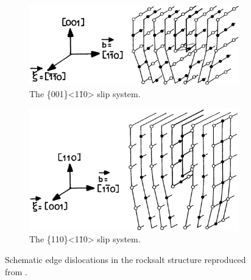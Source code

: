 \begin{figure}
\centering
\begin{subfigure}{0.6\textwidth}
\centering
\includegraphics[width=\textwidth]{NaCl_001_1-10}
\caption{The \{001\}<1\={1}0> slip system.}
\end{subfigure}
\par\bigskip
\begin{subfigure}{0.6\textwidth}
\centering
\includegraphics[width=\textwidth]{NaCl_110_1-10}
\caption{The \{110\}<1\={1}0> slip system.}
\end{subfigure}

\caption{Schematic edge dislocations in the rocksalt structure reproduced from \cite{Haasen1985}. \label{fig:Schematic_NaCl_dislocs}}
\end{figure}


























































